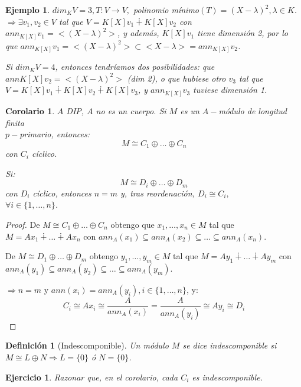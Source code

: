 \documentclass[11pt,a4paper]{article}
\theoremstyle{break}
\newtheorem{corollary}[theorem]{Corolario}
\newtheorem{example}[theorem]{Ejemplo}
\newtheorem{definition}[theorem]{Definición}
\newtheorem{task}[theorem]{Ejercicio}
\begin{document}
\begin{example}
$dim_{K} V = 3, T: V \to V,$ polinomio mínimo$(T) = (X - \lambda)^{2}, \lambda \in K$. \\
$\Rightarrow \exists v_{1}, v_{2} \in V$ tal que $V = K[X]v_{1} \dotplus K[X]v_{2}$ con $ann_{K[X]}v_{1} = <(X - \lambda)^{2}>$, y además, $K[X]v_{1}$ tiene dimensión 2, por lo que $ann_{K[X]} v_{1} = <(X - \lambda)^{2}> \subset <X - \lambda> = ann_{K[X]}v_{2}$. 

Si $dim_{K} V = 4$, entonces tendríamos dos posibilidades: que $ann{K[X]}v_{2} = <(X-\lambda)^{2}>$ (dim 2), o que hubiese otro $v_{3}$ tal que $V = K[X]v_{1} \dotplus K[X]v_{2} \dotplus K[X]v_{3}$, y $ann_{K[X]}v_{3}$ tuviese dimensión 1.
\end{example}

\begin{corollary}
$A$ DIP, $A$ no es un cuerpo. Si $M$ es un $A-$módulo de longitud finita \\ $p-$primario, entonces:
$$M \cong C_{1} \oplus \dots \oplus C_{n}$$
con $C_{i}$ cíclico.

Si:
$$M \cong D_{i} \oplus \dots \oplus D_{m}$$
con $D_{i}$ cíclico, entonces $n=m$ y, tras reordenación, $D_{i} \cong C_{i},$ \\ $\forall i \in \{1, \dots, n\}$.
\end{corollary}

\begin{proof}
De $M \cong C_{1} \oplus \dots \oplus C_{n}$ obtengo que $x_{1}, \dots, x_{n} \in M$ tal que $M = Ax_{1} \dotplus \dots \dotplus Ax_{n}$ con $ann_{A}(x_{1}) \subseteq ann_{A}(x_{2}) \subseteq \dots \subseteq ann_{A}(x_{n})$.

De $M \cong D_{1} \oplus \dots \oplus D_{m}$ obtengo $y_{1}, \dots, y_{m} \in M$ tal que $M = Ay_{1} \dotplus \dots \dotplus Ay_{m}$ con $ann_{A}(y_{1}) \subseteq ann_{A}(y_{2}) \subseteq \dots \subseteq ann_{A}(y_{m})$.

$\Rightarrow n = m$ y $ann(x_{i}) = ann_{A}(y_{i}), i \in \{1, \dots, n\}$, y:
$$C_{i} \cong Ax_{i} \cong \frac{A}{ann_{A}(x_{i})} = \frac{A}{ann_{A}(y_{i})} \cong Ay_{i} \cong D_{i}$$
\end{proof}

\begin{definition}[Indescomponible]
Un módulo $M$ se dice indescomponible si $M \cong L \oplus N \Rightarrow L = \{0\}$ ó $N = \{0\}$.
\end{definition}

\begin{task}
Razonar que, en el corolario, cada $C_{i}$ es indescomponible.
\end{task}
\end{document}
